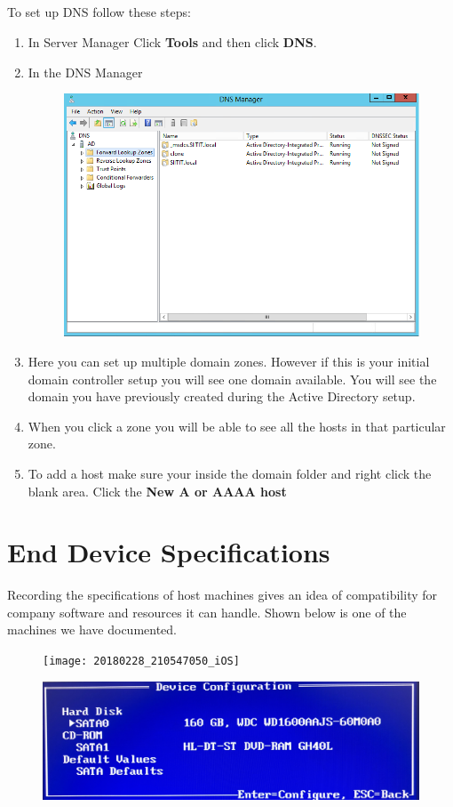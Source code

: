 \documentclass{article}
\begin{document}
\subsection{}
To set up DNS follow these steps:
\begin{enumerate}
\item In Server Manager Click \textbf{Tools} and then click \textbf{DNS}.
\item In the DNS Manager 
\begin{figure}[h]
	\centering
	\includegraphics[width=0.6\linewidth]{dns/dns-install5}
\end{figure}
\item Here you can set up multiple domain zones. However if this is your initial domain controller setup you will see one domain available. You will see the domain you have previously created during the Active Directory setup.
\item When you click a zone you will be able to see all the hosts in that particular zone.
\item To add a host make sure your inside the domain folder and right click the blank area. Click the \textbf{New A or AAAA host}  
\end{enumerate}
\newpage
\section{End Device Specifications}
Recording the specifications of host machines gives an idea of compatibility for company software and resources it can handle.
\newline \newline
Shown below is one of the machines we have documented.
\begin{figure}[h]
	\centering
	\texttt{[image: 20180228\_210547050\_iOS]}
\end{figure}
\begin{figure}
	\centering
	\includegraphics[width=1\linewidth]{"spec2 machine"}
\end{figure}
\newpage
\end{document}
